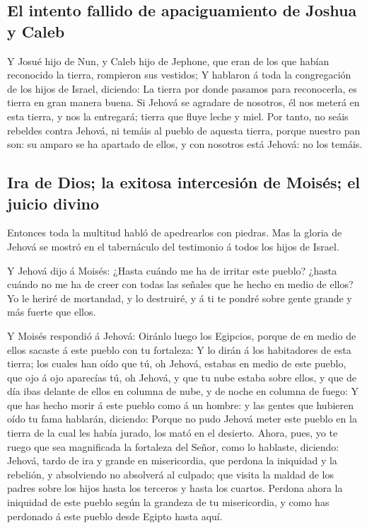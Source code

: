 \hypertarget{el-intento-fallido-de-apaciguamiento-de-joshua-y-caleb}{%
\subsection{El intento fallido de apaciguamiento de Joshua y
Caleb}\label{el-intento-fallido-de-apaciguamiento-de-joshua-y-caleb}}

 Y Josué hijo de Nun, y Caleb hijo de Jephone, que eran de
los que habían reconocido la tierra, rompieron sus vestidos;
 Y hablaron á toda la congregación de los hijos de Israel,
diciendo: La tierra por donde pasamos para reconocerla, es tierra en
gran manera buena.  Si Jehová se agradare de nosotros, él
nos meterá en esta tierra, y nos la entregará; tierra que fluye leche y
miel.  Por tanto, no seáis rebeldes contra Jehová, ni temáis
al pueblo de aquesta tierra, porque nuestro pan son: su amparo se ha
apartado de ellos, y con nosotros está Jehová: no los temáis.

\hypertarget{ira-de-dios-la-exitosa-intercesiuxf3n-de-moisuxe9s-el-juicio-divino}{%
\subsection{Ira de Dios; la exitosa intercesión de Moisés; el juicio
divino}\label{ira-de-dios-la-exitosa-intercesiuxf3n-de-moisuxe9s-el-juicio-divino}}

 Entonces toda la multitud habló de apedrearlos con
piedras. Mas la gloria de Jehová se mostró en el tabernáculo del
testimonio á todos los hijos de Israel.

 Y Jehová dijo á Moisés: ¿Hasta cuándo me ha de irritar
este pueblo? ¿hasta cuándo no me ha de creer con todas las señales que
he hecho en medio de ellos?  Yo le heriré de mortandad, y
lo destruiré, y á ti te pondré sobre gente grande y más fuerte que
ellos.

 Y Moisés respondió á Jehová: Oiránlo luego los Egipcios,
porque de en medio de ellos sacaste á este pueblo con tu fortaleza:
 Y lo dirán á los habitadores de esta tierra; los cuales
han oído que tú, oh Jehová, estabas en medio de este pueblo, que ojo á
ojo aparecías tú, oh Jehová, y que tu nube estaba sobre ellos, y que de
día ibas delante de ellos en columna de nube, y de noche en columna de
fuego:  Y que has hecho morir á este pueblo como á un
hombre: y las gentes que hubieren oído tu fama hablarán, diciendo:
 Porque no pudo Jehová meter este pueblo en la tierra de la
cual les había jurado, los mató en el desierto.  Ahora,
pues, yo te ruego que sea magnificada la fortaleza del Señor, como lo
hablaste, diciendo:  Jehová, tardo de ira y grande en
misericordia, que perdona la iniquidad y la rebelión, y absolviendo no
absolverá al culpado; que visita la maldad de los padres sobre los hijos
hasta los terceros y hasta los cuartos.  Perdona ahora la
iniquidad de este pueblo según la grandeza de tu misericordia, y como
has perdonado á este pueblo desde Egipto hasta aquí.

